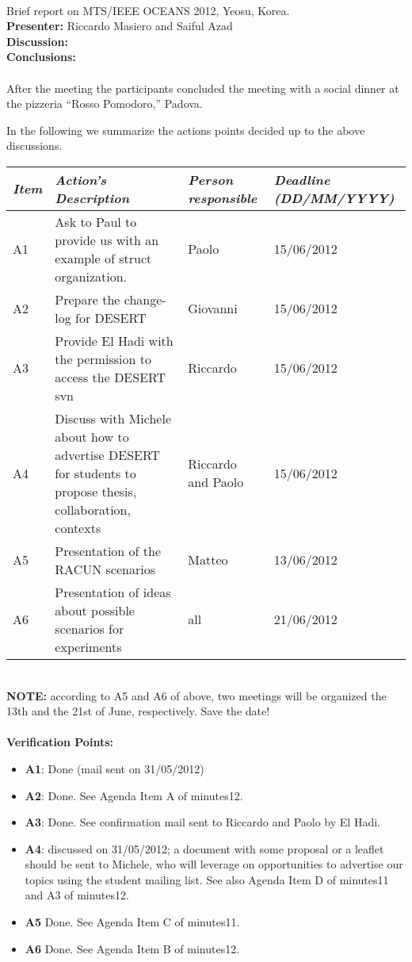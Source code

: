 \documentclass[11pt,journal,draftclsnofoot,onecolumn,twoside,letterpaper]{IEEEtran}
\theoremstyle{definition} \newtheorem{definition}[]{Definition}
\theoremstyle{theorem} \newtheorem{theorem}[]{Theorem}
\begin{document}
\  \\
 Brief report on MTS/IEEE OCEANS 2012, Yeosu, Korea.\\
{\bf Presenter:} Riccardo Masiero and Saiful Azad \\
{\bf Discussion:} \\
{\bf Conclusions:} \\

\  \\
 After the meeting the participants concluded the meeting with a social dinner at the pizzeria ``Rosso Pomodoro,'' Padova.\\

\newpage


In the following we summarize the actions points decided up to the above discussions. 

\begin{tabular}{|p{}|p{}|p{}|p{}|}
\hline
{\it Item} & {\it Action's Description} & {\it Person responsible} & {\it Deadline (DD/MM/YYYY)}\\
\hline
A1 &  Ask to Paul to provide us with an example of struct organization. & Paolo  & 15/06/2012 \\ 
A2 &  Prepare the change-log for DESERT & Giovanni & 15/06/2012\\
A3 &  Provide El Hadi with the permission to access the DESERT svn & Riccardo & 15/06/2012\\
A4 &  Discuss with Michele about how to advertise DESERT for students to propose thesis, collaboration, contexts & Riccardo and Paolo & 15/06/2012\\ 
A5 & Presentation of the RACUN scenarios & Matteo & 13/06/2012\\
A6 & Presentation of ideas about possible scenarios for experiments & all & 21/06/2012\\
\hline
\end{tabular}
\ \\
{\bf NOTE:} according to A5 and A6 of above, two meetings will be organized the 13th and the 21st of June, respectively. Save the date!
\ \\
\ \\
{\bf Verification Points:}
\begin{itemize}
  \item {\bf A1}: Done (mail sent on 31/05/2012)
  \item {\bf A2}: Done. See Agenda Item A of minutes12.
  \item {\bf A3}: Done. See confirmation mail sent to Riccardo and Paolo by El Hadi.
  \item {\bf A4}: discussed on 31/05/2012; a document with some proposal or a leaflet should be sent to Michele, who will leverage on opportunities to advertise our topics using the student mailing list. See also Agenda Item D of minutes11 and A3 of minutes12.
  \item {\bf A5} Done. See Agenda Item C of minutes11. 
  \item {\bf A6} Done. See Agenda Item B of minutes12.
\end{itemize}
\end{document}
